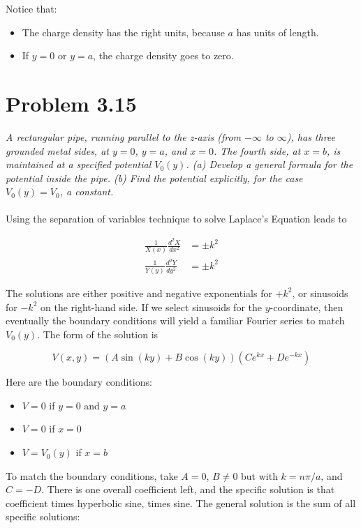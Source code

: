 \documentclass[10pt]{article}
\begin{document}
Notice that:
\begin{itemize}
\item The charge density has the right units, because $a$ has units of length.
\item If $y=0$ or $y=a$, the charge density goes to zero.
\end{itemize}

\section{Problem 3.15}

\textit{A rectangular pipe, running parallel to the z-axis (from $-\infty$ to $\infty$), has three grounded metal sides, at $y=0$, $y=a$, and $x=0$.  The fourth side, at $x=b$, is maintained at a specified potential $V_0(y)$.  (a) Develop a general formula for the potential inside the pipe.  (b) Find the potential explicitly, for the case $V_0(y) = V_0$, a constant.} \\ \\
Using the separation of variables technique to solve Laplace's Equation leads to

\begin{align}
\frac{1}{X(x)}\frac{d^2X}{dx^2} &= \pm k^2 \\
\frac{1}{Y(y)}\frac{d^2Y}{dy^2} &= \pm k^2
\end{align}

The solutions are either positive and negative exponentials for $+k^2$, or sinusoids for $-k^2$ on the right-hand side.  If we select sinusoids for the $y$-coordinate, then eventually the boundary conditions will yield a familiar Fourier series to match $V_0(y)$.  The form of the solution is

\begin{equation}
V(x,y) = \left( A\sin(ky) + B\cos(ky) \right)\left( C e^{kx} + D e^{-kx} \right)
\end{equation}

Here are the boundary conditions:

\begin{itemize}
\item $V = 0$ if $y=0$ and $y=a$
\item $V = 0$ if $x=0$
\item $V = V_0(y)$ if $x = b$
\end{itemize}

To match the boundary conditions, take $A=0$, $B\neq 0$ but with $k=n\pi/a$, and $C=-D$.  There is one overall coefficient left, and the specific solution is that coefficient times hyperbolic sine, times sine.  The general solution is the sum of all specific solutions:
\end{document}
